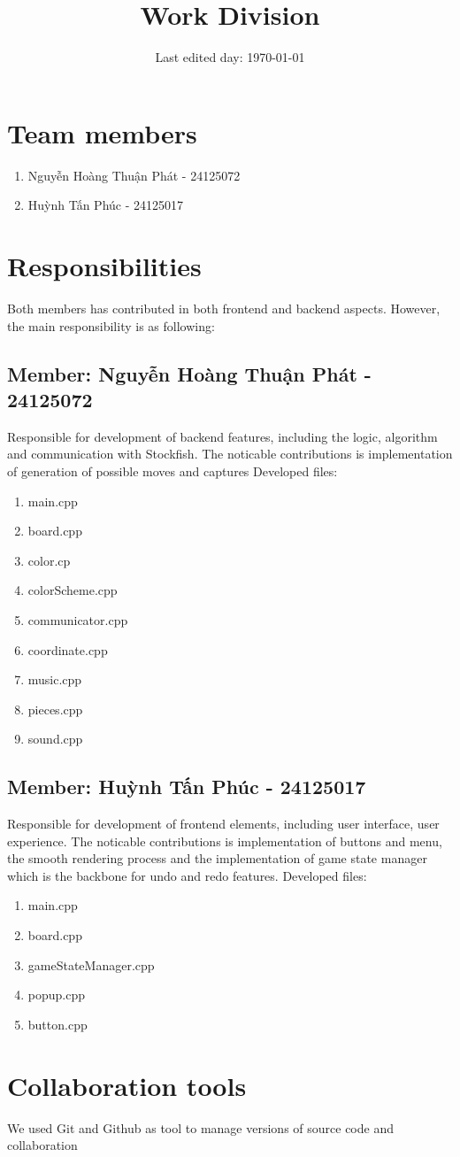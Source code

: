 \documentclass[a4paper, 10pt, titlepage]{article}
\title{Work Division}
\date{Last edited day: \selectlanguage{english}\today}
\begin{document}
\maketitle
\section{Team members}
\begin{enumerate}
    \item Nguyễn Hoàng Thuận Phát - 24125072
    \item Huỳnh Tấn Phúc - 24125017
\end{enumerate}
\section{Responsibilities}
Both members has contributed in both frontend and backend aspects. However, the main responsibility is as following:
\subsection{ Member: Nguyễn Hoàng Thuận Phát - 24125072}
Responsible for development of backend features, including the logic, algorithm and communication with Stockfish. The noticable contributions is implementation of generation of possible moves and captures
Developed files:
\ttfamily
\begin{enumerate}
    \item main.cpp
    \item board.cpp
    \item color.cp
    \item colorScheme.cpp
    \item communicator.cpp
    \item coordinate.cpp
    \item music.cpp
    \item pieces.cpp
    \item sound.cpp
\end{enumerate}
\rmfamily
\subsection{Member: Huỳnh Tấn Phúc - 24125017}
Responsible for development of frontend elements, including user interface, user experience. The noticable contributions is implementation of buttons and menu, the smooth rendering process and the implementation of game state manager which is the backbone for undo and redo features.
Developed files:
\ttfamily
\begin{enumerate}
    \item main.cpp
    \item board.cpp
    \item gameStateManager.cpp
    \item popup.cpp
    \item button.cpp
\end{enumerate}
\rmfamily
\section{Collaboration tools}
We used Git and Github as tool to manage versions of source code and collaboration
\end{document}
